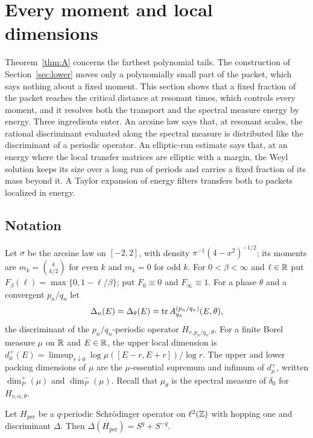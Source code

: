 \section{Every moment and local dimensions}\label{sec:moments}

Theorem~\ref{thm:A} concerns the farthest polynomial tails. The construction of Section~\ref{sec:lower} moves only a polynomially small part of the packet, which says nothing about a fixed moment. This section shows that a fixed fraction of the packet reaches the critical distance at resonant times, which controls every moment, and it resolves both the transport and the spectral measure energy by energy. Three ingredients enter. An arcsine law says that, at resonant scales, the rational discriminant evaluated along the spectral measure is distributed like the discriminant of a periodic operator. An elliptic-run estimate says that, at an energy where the local transfer matrices are elliptic with a margin, the Weyl solution keeps its size over a long run of periods and carries a fixed fraction of its mass beyond it. A Taylor expansion of energy filters transfers both to packets localized in energy.

\subsection{Notation}\label{sec:mom-notation}

Let $\sigma$ be the arcsine law on $[-2,2]$, with density $\pi^{-1}(4-x^2)^{-1/2}$; its moments are $m_k=\binom{k}{k/2}$ for even $k$ and $m_k=0$ for odd $k$. For $0<\beta<\infty$ and $\ell\in\mathbb R$ put $F_\beta(\ell)=\max\{0,1-\ell/\beta\}$; put $F_0\equiv0$ and $F_\infty\equiv1$. For a phase $\theta$ and a convergent $p_n/q_n$ let
\[
\Delta_n(E)=\Delta_\theta(E)=\operatorname{tr} A^{(p_n/q_n)}_{q_n}(E,\theta),
\]
the discriminant of the $p_n/q_n$-periodic operator $H_{v,p_n/q_n,\theta}$. For a finite Borel measure $\mu$ on $\mathbb R$ and $E\in\mathbb R$, the upper local dimension is $d^+_\mu(E)=\limsup_{r\downarrow0}\log\mu([E-r,E+r])/\log r$. The upper and lower packing dimensions of $\mu$ are the $\mu$-essential supremum and infimum of $d^+_\mu$, written $\dim_P^+(\mu)$ and $\dim_P^-(\mu)$. Recall that $\mu_\theta$ is the spectral measure of $\delta_0$ for $H_{v,\alpha,\theta}$.

\begin{lemma}\label{lem:magic}
Let $H_{\mathrm{per}}$ be a $q$-periodic Schr\"odinger operator on $\ell^2(\mathbb Z)$ with hopping one and discriminant $\Delta$. Then $\Delta(H_{\mathrm{per}})=S^q+S^{-q}$.
\end{lemma}

